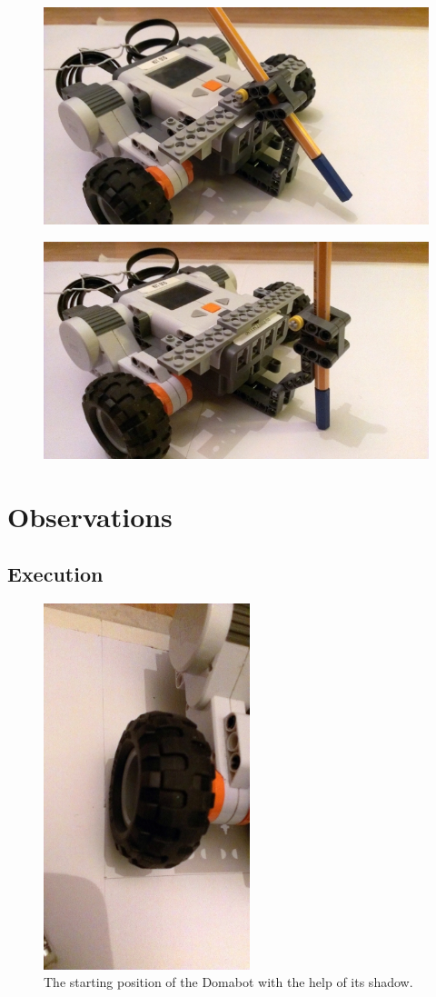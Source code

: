 \documentclass{scrartcl}
\begin{document}
\begin{figure}
\centering
\begin{minipage}{.5\textwidth}
  \centering
  \includegraphics[width=.5\linewidth]{img/pen_up.jpg}
  \label{fig:pen_up}
\end{minipage}%
\begin{minipage}{.5\textwidth}
  \centering
  \includegraphics[width=.5\linewidth]{img/pen_down.jpg}
  \label{fig:pen_down}
\end{minipage}
\end{figure}

\section{Observations}
\subsection{Execution}
\begin{figure}
 \center
 \includegraphics[width= 6cm]{img/wheel_adjust.jpg}
 \caption{The starting position of the Domabot with the help of its shadow.}
 \label{fig:setup}
\end{figure}
\end{document}

